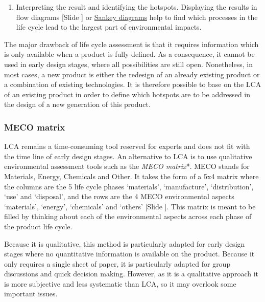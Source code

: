 \documentclass{article}
\newcounter{slide}
\begin{document}
\begin{enumerate}
	\item Interpreting the result and identifying the hotspots. Displaying the results in flow diagrams {\color{blue}[Slide ]} or \href{https://en.wikipedia.org/wiki/Sankey_diagram}{Sankey diagrams} help to find which processes in the life cycle lead to the largest part of environmental impacts. 
\end{enumerate}

The major drawback of life cycle assessment is that it requires information which is only available when a product is fully defined. As a consequence, it cannot be used in early design stages, where all possibilities are still open. Nonetheless, in most cases, a new product is either the redesign of an already existing product or a combination of existing technologies. It is therefore possible to base on the LCA of an existing product in order to define which hotspots are to be addressed in the design of a new generation of this product. 

\subsubsection{MECO matrix}
\label{sec:streamlined}

LCA remains a time-consuming tool reserved for experts and does not fit with the time line of early design stages. An alternative to LCA is to use qualitative environmental assessment tools such as the \emph{MECO matrix}*. MECO stands for Materials, Energy, Chemicals and Other. It takes the form of a 5x4 matrix where the columns are the 5 life cycle phases `materials', `manufacture', `distribution', `use' and `disposal', and the rows are the 4 MECO environmental aspects `materials',  `energy', `chemicals' and `others' {\color{blue}[Slide ]}. This matrix is meant to be filled by thinking about each of the environmental aspects across each phase of the product life cycle.

Because it is qualitative, this method is particularly adapted for early design stages where no quantitative information is available on the product. Because it only requires a single sheet of paper, it is particularly adapted for group discussions and quick decision making. However, as it is a qualitative approach it is more subjective and less systematic than LCA, so it may overlook some important issues.
\end{document}
